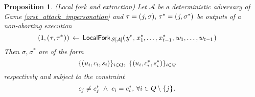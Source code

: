 \documentclass[10pt, psamsfonts, reqno]{amsart}
\newtheorem{prop}[thm]{Proposition}
\theoremstyle{definition}
\theoremstyle{remark}
\numberwithin{equation}{section}
\begin{document}
\begin{prop}\label{orst_extractability_prop}
\textup{(\textit{Local fork and extraction})}
Let $\mathcal{A}$ be a deterministic adversary of
Game \textup{\ref{orst_attack_impersonation}}
and
$\tau = (\hspace{0.5pt}j, \sigma),
\hspace{2pt}\tau^* = (\hspace{0.5pt}j, \sigma^*)$
be outputs of a non-aborting execution
\vspace{5pt}
\begin{equation*}
(
	\vspace{1pt}
	1,
	\vspace{1pt}
	(
		\hspace{0.5pt}
		\tau,
		\tau^*
		\hspace{0.5pt}
	)
	\hspace{0.5pt}
)
\hspace{2pt}
\leftarrow
\hspace{2pt}
\mathsf{LocalFork}_{
		\hspace{1pt}
    	\mathcal{S}\hspace{0pt}[
    		\hspace{0pt}
    		\mathcal{A}
    		\hspace{0pt}
    	]
    }
	(
   		\hspace{1pt}
		y ^*,
		\hspace{1pt}
		x_1^*, \dots, x_{t-1}^*,
		\hspace{1pt}
		w_1, \dots, w_{t-1}
		\hspace{1pt}
   	)
\vspace{5pt}
\end{equation*}
Then $\sigma,\hspace{1pt}\sigma^*$ are of the form
\vspace{5pt}
\begin{equation}\label{orst_forked_proofs}
\{(u_i, c_i, s_i)\}_{i \in Q},\ \{(u_i, c_i^*, s_i^*)\}_{i \in Q}
\vspace{5pt}
\end{equation}
respectively and subject to the constraint
\vspace{5pt}
\begin{equation}\label{orst_forked_challenges}
c_j \neq c_j^*
\ \land
\ c_i = c_i^*,\hspace{2pt}
\forall i \in Q \setminus \{\hspace{0.5pt}j\hspace{0.5pt}\}
\hspace{0.5pt}.
\vspace{5pt}

\end{equation}
\end{prop}
\end{document}
